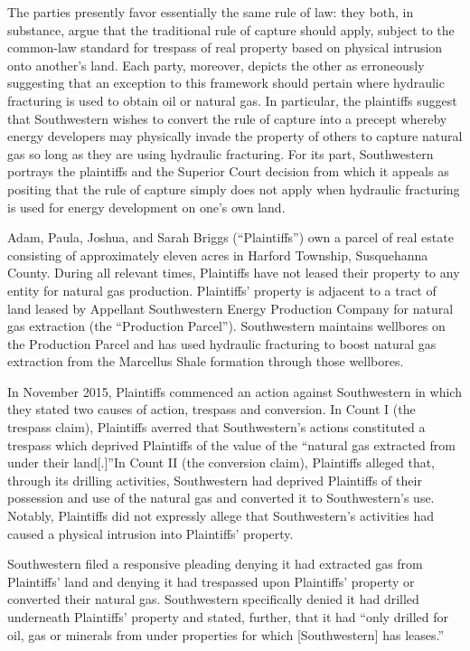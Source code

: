The parties presently favor essentially the same rule of law: they both, in
substance, argue that the traditional rule of capture should apply, subject to
the common-law standard for trespass of real property based on physical
intrusion onto another's land. Each party, moreover, depicts the other as
erroneously suggesting that an exception to this framework should pertain where
hydraulic fracturing is used to obtain oil or natural gas. In particular, the
plaintiffs suggest that Southwestern wishes to convert the rule of capture into
a precept whereby energy developers may physically invade the property of others
to capture natural gas so long as they are using hydraulic fracturing. For its
part, Southwestern portrays the plaintiffs and the Superior Court decision from
which it appeals as positing that the rule of capture simply does not apply when
hydraulic fracturing is used for energy development on one's own land.


Adam, Paula, Joshua, and Sarah Briggs (``Plaintiffs'') own a parcel of real
estate consisting of approximately eleven acres in Harford Township, Susquehanna
County. During all relevant times, Plaintiffs have not leased their property to
any entity for natural gas production. Plaintiffs' property is adjacent to a
tract of land leased by Appellant Southwestern Energy Production Company for
natural gas extraction (the ``Production Parcel''). Southwestern maintains
wellbores on the Production Parcel and has used hydraulic fracturing to boost
natural gas extraction from the Marcellus Shale formation through those
wellbores.


In November 2015, Plaintiffs commenced an action against Southwestern in which
they stated two causes of action, trespass and conversion. In Count I (the
trespass claim), Plaintiffs averred that Southwestern's actions constituted a
trespass which deprived Plaintiffs of the value of the ``natural gas extracted
from under their land[.]''In Count II (the conversion claim), Plaintiffs alleged
that, through its drilling activities, Southwestern had deprived Plaintiffs of
their possession and use of the natural gas and converted it to Southwestern's
use. Notably, Plaintiffs did not expressly allege that Southwestern's activities
had caused a physical intrusion into Plaintiffs' property.

Southwestern filed a responsive pleading denying it had extracted gas from
Plaintiffs' land and denying it had trespassed upon Plaintiffs' property or
converted their natural gas. Southwestern specifically denied it had drilled
underneath Plaintiffs' property and stated, further, that it had ``only drilled
for oil, gas or minerals from under properties for which [Southwestern] has
leases.'' 

